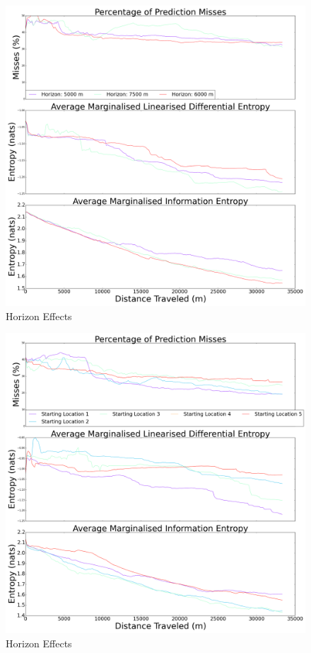 \documentclass{article}
\begin{document}
			
		\begin{figure}[!htbp]
		\centering
			\includegraphics[width = \linewidth]{Figures/compare_horizons.png}
		\caption{Horizon Effects}
		\label{Figure:Results:CompareHorizons}
		\end{figure}
	
		\begin{figure}[!htbp]
		\centering
			\includegraphics[width = \linewidth]{Figures/compare_locations.png}
		\caption{Horizon Effects}
		\label{Figure:Results:CompareLocations}
		\end{figure}
		
\end{document}
